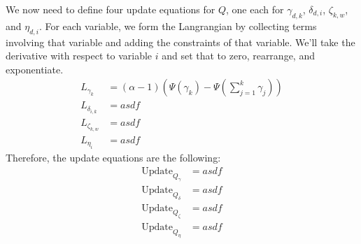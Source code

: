 \documentclass[12pt]{article}
\begin{document}
We now need to define four update equations for $Q$, one each for $\gamma_{d,k}$, $\delta_{d,i}$, $\zeta_{k,w}$, and $\eta_{d,i}$.  For each variable, we form the Langrangian by collecting terms involving that variable and adding the constraints of that variable.  We'll take the derivative with respect to variable $i$ and set that to zero, rearrange, and exponentiate.
\begin{align*}
L_{\gamma_{k}} &= (\alpha - 1)(\Psi(\gamma_k) - \Psi(\sum_{j=1}^k \gamma_j) ) \\ 
L_{\delta_{i,k}} &= asdf \\
L_{\zeta_{k,w}} &= asdf \\
L_{\eta_{i}} &= asdf 
\end{align*}
Therefore, the update equations are the following:
\begin{align*}
\mathrm{Update}_{Q_\gamma} &= asdf \\ 
\mathrm{Update}_{Q_\delta} &= asdf \\
\mathrm{Update}_{Q_\zeta} &= asdf \\
\mathrm{Update}_{Q_\eta} &= asdf 
\end{align*}



\end{document}
